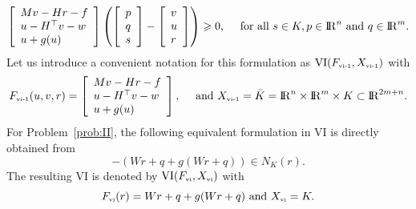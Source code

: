 \begin{equation}
  \label{eq:vi-I-bis}
  \left[\begin{array}{l}
    M v-H r-f \\
    u - H^\top v - w \\
    u + g(u )
  \end{array}\right] \left(
  \left[\begin{array}{l}
      p  \\ q \\ s
    \end{array}\right] - \left[\begin{array}{l}
      v  \\ u \\ r
    \end{array}\right]
\right) \geq 0,\quad \text{ for all } s \in K,  p \in \RR^n \text{ and }  q \in \RR^m.
\end{equation}
Let us introduce a convenient notation for this formulation as $\mathrm{VI}(F_{{\hbox{\tiny{vi-1}}}},X_{{\hbox{\tiny{vi-1}}}})$ with
\begin{equation}
  \label{eq:vi-I}
  F_{\vione}(u,v,r) = \left[\begin{array}{l}
    M v-H r-f \\
    u - H^\top v - w \\
    u + g(u)
  \end{array}\right],\quad \text{ and } X_{\vione} = \bar K = \RR^n \times \RR^m \times K\subset \RR^{2m+n}.
\end{equation}
For Problem~\ref{prob:II}, the following equivalent formulation in VI is directly obtained from
\begin{equation}
  \label{eq:inclusion-1}
  -(W r +q + g(Wr+q))  \in N_K(r).
\end{equation}
 The resulting VI is denoted by $\mathrm{VI}(F_{{\hbox{\tiny{vi}}}},X_{{\hbox{\tiny{vi}}}})$ with
\begin{equation}
  \label{eq:vi-II}
  F_{\vitwo}(r) = W r +q + g(Wr+q)\text{ and } X_{\vitwo} = K.
\end{equation}

